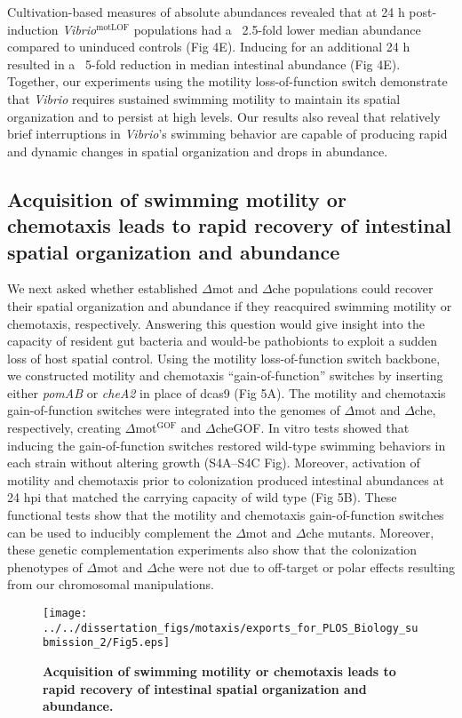 Cultivation-based measures of absolute abundances revealed that at 24 h post-induction \textit{Vibrio}$^{\text{motLOF}}$ populations had a ~2.5-fold lower median abundance compared to uninduced controls (Fig 4E). Inducing for an additional 24 h resulted in a ~5-fold reduction in median intestinal abundance (Fig 4E). Together, our experiments using the motility loss-of-function switch demonstrate that \textit{Vibrio} requires sustained swimming motility to maintain its spatial organization and to persist at high levels. Our results also reveal that relatively brief interruptions in \textit{Vibrio}'s swimming behavior are capable of producing rapid and dynamic changes in spatial organization and drops in abundance.


\subsection{Acquisition of swimming motility or chemotaxis leads to rapid recovery of intestinal spatial organization and abundance}
We next asked whether established $\Delta$mot and $\Delta$che populations could recover their spatial organization and abundance if they reacquired swimming motility or chemotaxis, respectively. Answering this question would give insight into the capacity of resident gut bacteria and would-be pathobionts to exploit a sudden loss of host spatial control. Using the motility loss-of-function switch backbone, we constructed motility and chemotaxis ``gain-of-function'' switches by inserting either \textit{pomAB} or \textit{cheA2} in place of dcas9 (Fig 5A). The motility and chemotaxis gain-of-function switches were integrated into the genomes of $\Delta$mot and $\Delta$che, respectively, creating $\Delta$mot$^{\text{GOF}}$ and $\Delta$cheGOF. In vitro tests showed that inducing the gain-of-function switches restored wild-type swimming behaviors in each strain without altering growth (S4A–S4C Fig). Moreover, activation of motility and chemotaxis prior to colonization produced intestinal abundances at 24 hpi that matched the carrying capacity of wild type (Fig 5B). These functional tests show that the motility and chemotaxis gain-of-function switches can be used to inducibly complement the $\Delta$mot and $\Delta$che mutants. Moreover, these genetic complementation experiments also show that the colonization phenotypes of $\Delta$mot and $\Delta$che were not due to off-target or polar effects resulting from our chromosomal manipulations.

\begin{figure}[h!]
	\centerline{
		\texttt{[image: ../../dissertation\_figs/motaxis/exports\_for\_PLOS\_Biology\_submission\_2/Fig5.eps]}}
	\caption{\textbf{Acquisition of swimming motility or chemotaxis leads to rapid recovery of intestinal spatial organization and abundance.}}
\end{figure}

